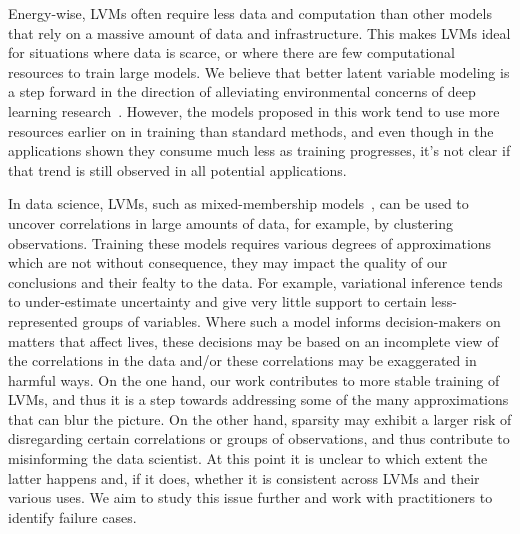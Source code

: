 Energy-wise, LVMs often require less data and
computation than other models that rely on a massive amount of data
and infrastructure. This makes LVMs ideal for
situations where data is scarce, or where there are few computational
resources to train large models. We believe that better latent
variable modeling is a step forward in the direction of alleviating
environmental concerns of deep learning
research~\citep{strubell2019energy}. However, the models proposed in
this work tend to use more resources earlier on in training than
standard methods, and even though in the applications shown they
consume much less as training progresses, it's not clear if that
trend is still observed in all potential applications.

In data science, LVMs, such as
mixed-membership models~\citep{blei2014build}, can be used to uncover
correlations in large amounts of data, for example, by clustering
observations. Training these models requires various degrees of
approximations which are not without consequence, they may impact the
quality of our conclusions and their fealty to the data. For example,
variational inference tends to under-estimate uncertainty and give
very little support to certain less-represented groups of variables.
Where such a model informs decision-makers on matters that affect
lives, these decisions may be based on an incomplete view of the
correlations in the data and/or these correlations may be exaggerated
in harmful ways. On the one hand, our work contributes to more stable
training of LVMs, and thus it is a step towards addressing some of
the many approximations that can blur the picture. On the other hand,
sparsity may exhibit a larger risk of disregarding certain
correlations or groups of observations, and thus contribute to
misinforming the data scientist. At this point it is unclear to which
extent the latter happens and, if it does, whether it is consistent
across LVMs and their various uses. We aim to study this issue
further and work with practitioners to identify failure cases.

\cleardoublepage

\singlespacing